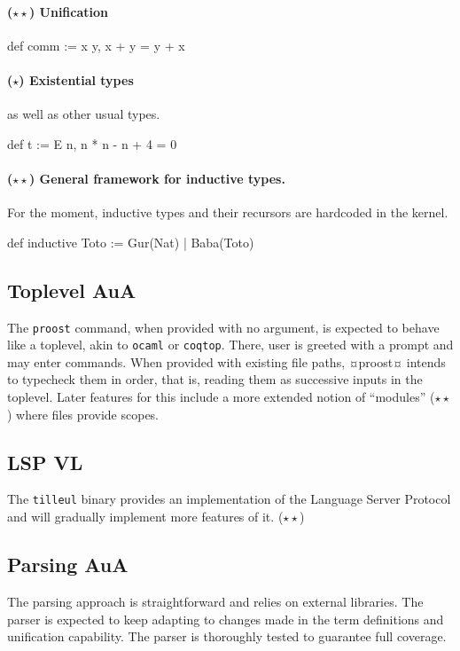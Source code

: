 \documentclass[twocolumn]{article}
\newcommand{\members}[1]{\texorpdfstring{\hfill\scriptsize #1}{}}
\newcommand{\etun}{{\color{Green} ($\star$)} }
\newcommand{\etde}{{\color{Orange} ($\star\star$)} }
\begin{document}
\paragraph{\etde Unification}
\phantom{hello}
\begin{mdln}
def comm := \/x y, x + y = y + x
\end{mdln}

\paragraph{\etun Existential types} as well as other usual types.
\begin{mdln}
def t := E n, n * n - n + 4 = 0
\end{mdln}

\paragraph{\etde General framework for inductive types.} For the moment,
inductive types and their recursors are hardcoded in the kernel.
\begin{mdln}
def inductive Toto :=
  Gur(Nat) | Baba(Toto)
\end{mdln}

\subsection{Toplevel  \members{AuA}}
The \texttt{proost} command, when provided with no argument, is expected to
behave like a toplevel, akin to \texttt{ocaml} or \texttt{coqtop}. There, user
is greeted with a prompt and may enter commands. When provided with existing
file paths, ¤proost¤ intends to typecheck them in order, that is, reading them
as successive inputs in the toplevel. Later features for this include a more
extended notion of ``modules'' \etde where files provide scopes.

\subsection{LSP \members{VL}}
The \texttt{tilleul} binary provides an implementation of the Language Server
Protocol and will gradually implement more features of it. \etde

\subsection{Parsing \members{AuA}}
The parsing approach is straightforward and
relies on external libraries. The parser is expected to keep adapting to changes
made in the term definitions and unification capability. The parser is
thoroughly tested to guarantee full coverage.
\end{document}
